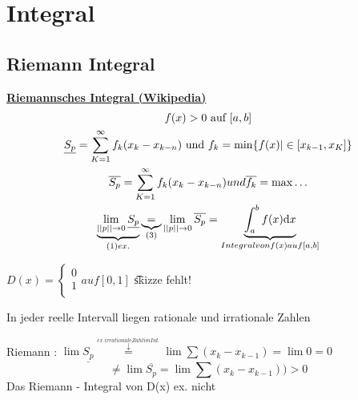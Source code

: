 \section{Integral}
\subsection{Riemann Integral }
\textbf{\href{https://de.wikipedia.org/wiki/Riemannsches_Integral}{Riemannsches Integral (Wikipedia)}}
\begin{gather*}
f(x)>0 \text{ auf } [a,b]\\
\underline{S_p}= \sum_{K=1}^{\infty} f_k (x_k - x_{k-n}) \text{ und } f_k =\min \{ f(x) | \in [x_{k-1},x_K ] \} \\
\overline{S_p}= \sum_{K=1}^{\infty} f_k (x_k - x_{k-n})und \overline{f_k} =\max \dots \\
\underbrace{ \lim\limits_{||p|| \rightarrow 0} \underline{S_p}}_{(1) ex.}\underbrace{=}_{(3)} \lim\limits_{||p|| \rightarrow 0 } \overline{S_p}= \underbrace{\int_a^b f(x) \mathrm{d}x}_{Integral von f(x) auf [a,b]}
\end{gather*}
\begin{example}
$ 	D(x)=\begin{cases} 
		0  \\    
		1 \\  
	\end{cases} auf[0,1]$
	 \t{skizze fehlt!}
\end{example}
\begin{remark}
In jeder reelle Intervall liegen rationale und irrationale Zahlen
\end{remark}
Riemann : $\lim \underline{S_p} \overset{\overset{ex. irrationale Zahl im Int.}{\downarrow}}{=} \lim \sum (x_k- x_{k-1}) 
= \lim 0 = 0 $ 
\[  \neq \lim \overline{S_p}= \lim \sum (x_k-x_{k-1}))> 0\]
Das Riemann - Integral von D(x) ex. nicht 

